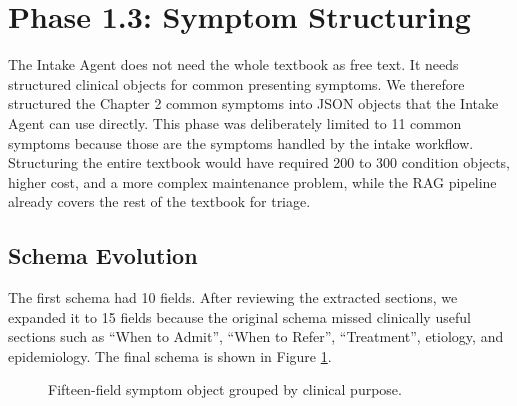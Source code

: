 \section{Phase 1.3: Symptom Structuring}

The Intake Agent does not need the whole textbook as free text. It needs structured clinical objects for common presenting symptoms. We therefore structured the Chapter 2 common symptoms into JSON objects that the Intake Agent can use directly. This phase was deliberately limited to 11 common symptoms because those are the symptoms handled by the intake workflow. Structuring the entire textbook would have required 200 to 300 condition objects, higher cost, and a more complex maintenance problem, while the RAG pipeline already covers the rest of the textbook for triage.

\subsection{Schema Evolution}

The first schema had 10 fields. After reviewing the extracted sections, we expanded it to 15 fields because the original schema missed clinically useful sections such as ``When to Admit'', ``When to Refer'', ``Treatment'', etiology, and epidemiology. The final schema is shown in Figure \ref{fig:symptom_schema}.

\begin{figure}[htbp]
\centering
{}
\caption{Fifteen-field symptom object grouped by clinical purpose.}
\label{fig:symptom_schema}
\end{figure}


